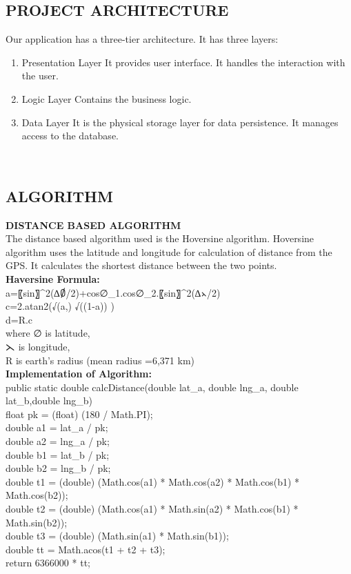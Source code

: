 \documentclass[12pt,a4paper]{article}
\begin{document}
\subsection{PROJECT ARCHITECTURE}
\hspace{0.7 cm} Our application has a three-tier architecture. It has three layers:

\begin{enumerate}

\item Presentation Layer
It provides user interface. It handles the interaction with the user.

\item Logic Layer
Contains the business logic.

\item Data Layer
It is the physical storage layer for data persistence. It manages access to the database.
\end{enumerate}	
\\
\subsection{ALGORITHM}
\textbf{DISTANCE BASED ALGORITHM}
\\
\hspace{0.7 cm} The distance based algorithm used is the Hoversine algorithm. Hoversine algorithm uses the latitude and longitude for calculation of distance from the GPS. It calculates the shortest distance between the two points.
\\
\textbf{Haversine Formula:}
\\
	a=〖sin〗^2(∆∅/2)+cos∅_1.cos∅_2.〖sin〗^2(∆⋋/2)
	\\
           c=2.atan2(√(a,) √((1-a)) )
           \\
           d=R.c
\\
where ∅ is latitude,
\\
            ⋋ is longitude,
            \\
             R is earth’s radius (mean radius =6,371 km)
\\
\textbf{Implementation of Algorithm:}
\\
public static double calcDistance(double lat_a, double lng_a, double lat_b,double lng_b) {
\\
			float pk = (float) (180 / Math.PI);
\\
			double a1 = lat_a / pk;
			\\
			double a2 = lng_a / pk;
			\\
			double b1 = lat_b / pk;
			\\
			double b2 = lng_b / pk;
\\
double t1 = (double) (Math.cos(a1) * Math.cos(a2) *          Math.cos(b1) * Math.cos(b2));
\\
double t2 = (double) (Math.cos(a1) * Math.sin(a2) * Math.cos(b1) * Math.sin(b2));
\\
			double t3 = (double) (Math.sin(a1) * Math.sin(b1));
\\
			double tt = Math.acos(t1 + t2 + t3);
\\
			return 6366000 * tt;
			\\
	}
\\
\newpage
\end{document}
